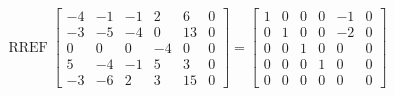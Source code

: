 \begin{exerciseAnswer} 


\[\operatorname{RREF} \left[\begin{array}{ccccc|c}
-4 & -1 & -1 & 2 & 6 & 0 \\
-3 & -5 & -4 & 0 & 13 & 0 \\
0 & 0 & 0 & -4 & 0 & 0 \\
5 & -4 & -1 & 5 & 3 & 0 \\
-3 & -6 & 2 & 3 & 15 & 0
\end{array}\right] = \left[\begin{array}{ccccc|c}
1 & 0 & 0 & 0 & -1 & 0 \\
0 & 1 & 0 & 0 & -2 & 0 \\
0 & 0 & 1 & 0 & 0 & 0 \\
0 & 0 & 0 & 1 & 0 & 0 \\
0 & 0 & 0 & 0 & 0 & 0
\end{array}\right] \]



\end{exerciseAnswer}
